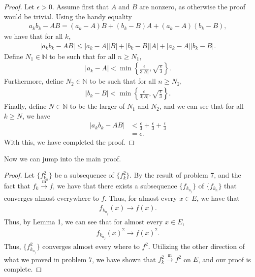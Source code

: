 \documentclass[10pt,a4paper]{article}
\theoremstyle{theorem}
\theoremstyle{definition}
\begin{document}
\begin{proof}
Let $\epsilon > 0$.  Assume first that $A$ and $B$ are nonzero, as otherwise the proof would be trivial. Using the handy equality
\begin{align*}
a_kb_k - AB = (a_k - A)B + (b_k - B)A + (a_k - A)(b_k - B),
\end{align*}
we have that for all $k$,
\begin{align*}
|a_kb_k - AB| \leq |a_k - A||B| + |b_k - B||A| + |a_k - A||b_k - B|.
\end{align*}
Define $N_1 \in \mathbb{N}$ to be such that for all $n \geq N_1$,
\begin{align*}
|a_k - A| < \min \left\{ \frac{\epsilon}{3 |B|}, \sqrt{\frac{\epsilon}{3}}\right\}.
\end{align*}
Furthermore, define $N_2 \in \mathbb{N}$ to be such that for all $n \geq N_2$,
\begin{align*}
|b_k - B| < \min \left\{ \frac{\epsilon}{3 |A|}, \sqrt{\frac{\epsilon}{3}}\right\}.
\end{align*}
Finally, define $N \in \mathbb{N}$ to be the larger of $N_1$ and $N_2$, and we can see that for all $k \geq N$, we have
\begin{align*}
|a_kb_k - AB| &< \frac{\epsilon}{3} +  \frac{\epsilon}{3} +  \frac{\epsilon}{3}\\
&= \epsilon.
\end{align*}
With this, we have completed the proof.
\end{proof}
Now we can jump into the main proof.
\begin{proof}
Let $\{f_{k_n}^2 \}$ be a subsequence of $\{f_k^2 \}$. By the result of problem 7, and the fact that $f_k \overset{\text{m}}{\to} f$, we have that there exists a subsequence $\{f_{k_{n_j}}\}$ of $\{f_{k_n}\}$ that converges almost everywhere to $f$. Thus, for almost every $x \in E$, we have that 
\begin{align*}
f_{k_{n_j}}(x) \to f(x).
\end{align*}
Thus, by Lemma 1,  we can see that for almost every $x \in E$, 
\begin{align*}
f_{k_{n_j}}(x)^2 \to f(x)^2.
\end{align*}
Thus,  $\{f_{k_{n_j}}^2\}$ converges almost every where to $f^2$. Utilizing the other direction of what we proved in problem 7, we have shown that $f^2_k \overset{\text{m}}{\to} f^2$ on $E$, and our proof is complete.
\end{proof}
\end{document}
